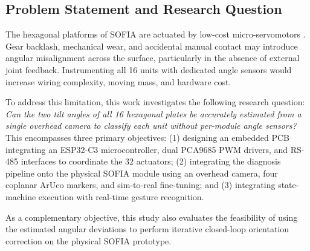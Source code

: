 \documentclass[lettersize,journal]{IEEEtran}
\begin{document}
	\subsection{Problem Statement and Research Question}
	The hexagonal platforms of SOFIA are actuated by low-cost micro-servomotors \cite{sofia_architecture}. Gear backlash, mechanical wear, and accidental manual contact may introduce angular misalignment across the surface, particularly in the absence of external joint feedback. Instrumenting all 16 units with dedicated angle sensors would increase wiring complexity, moving mass, and hardware cost.
	
	To address this limitation, this work investigates the following research question: \textit{Can the two tilt angles of all 16 hexagonal plates be accurately estimated from a single overhead camera to classify each unit without per-module angle sensors?} This encompasses three primary objectives: (1) designing an embedded PCB integrating an ESP32-C3 microcontroller, dual PCA9685 PWM drivers, and RS-485 interfaces to coordinate the 32 actuators; (2) integrating the diagnosis pipeline onto the physical SOFIA module using an overhead camera, four coplanar ArUco markers, and sim-to-real fine-tuning; and (3) integrating state-machine execution with real-time gesture recognition.
	
	As a complementary objective, this study
	also evaluates the feasibility of using
	the estimated angular deviations to perform
	iterative closed-loop orientation correction
	on the physical SOFIA prototype.
	
\end{document}
